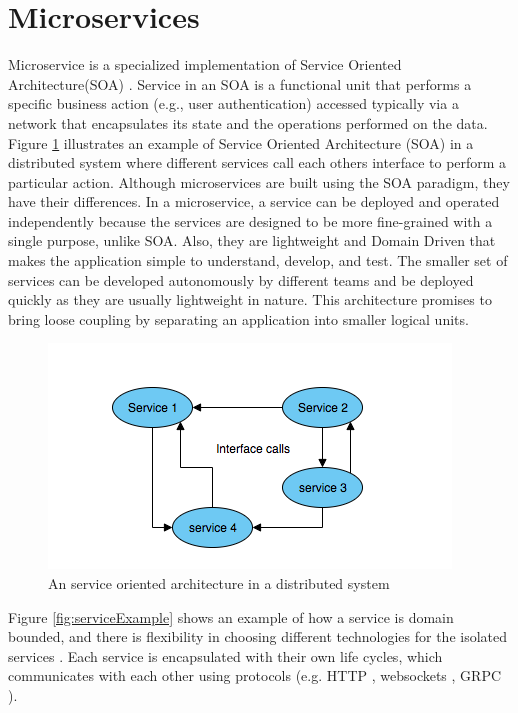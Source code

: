 \section{Microservices}

Microservice is a specialized implementation of Service Oriented Architecture(SOA) \cite[chapter ~3]{SOA}. Service in an SOA
is a functional unit that performs a specific business action (e.g., user authentication) accessed typically via a network that 
encapsulates its state and the operations performed on the data.  
Figure \ref{fig:objectBasedDS} illustrates an example of Service Oriented Architecture (SOA) in a distributed system where different services call each others interface
to perform a particular action. Although microservices are built using the SOA paradigm, they have their differences. In a microservice, a service can be deployed and 
operated independently because the services are designed to be more fine-grained with a single purpose, unlike SOA. 
Also, they are lightweight and Domain Driven \cite{DDD} that makes the application simple to understand, develop, and test. The smaller set of services
can be developed autonomously by different teams and be deployed quickly as they are usually lightweight in nature. This architecture promises to bring loose coupling 
by separating an application into smaller logical units. 


\begin{figure}[H]
    \centering \includegraphics[scale=0.7]{grafiken/objectBasedDS.png}
    \caption{An service oriented architecture in a distributed system 
        \cite[p.~62]{DistributedSystems}}
    \label{fig:objectBasedDS}
\end{figure}


Figure \ref{fig:serviceExample} shows an example of how 
a service is domain bounded, and there is flexibility in choosing different
technologies for the isolated services \cite{MicroserviceNewMan}. 
Each service is encapsulated with their own life cycles, which communicates with each other using protocols 
(e.g. HTTP \cite{HTTP}, websockets \cite{WebSockets}, GRPC \cite{grpc}). 

